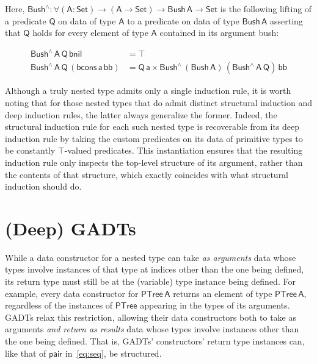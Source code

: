\documentclass[9pt]{entcs}
\begin{document}
\vspace*{-0.05in}

\noindent
Here, $\mathsf{Bush^{\wedge} : \forall (A : Set) \to (A \to Set) \to
  Bush\,A \to Set}$ is the following lifting of a predicate
$\mathsf{Q}$ on data of type $\mathsf{A}$ to a predicate on data of
type $\mathsf{Bush\,A}$ asserting that $\mathsf{Q}$ holds for every
element of type $\mathsf{A}$ contained in its argument bush:

\vspace*{-0.15in}

\begin{align*}
\mathsf{Bush^{\wedge}\,A\,Q\,bnil} &= \mathsf{\top} \\
\mathsf{Bush^{\wedge}\,A\,Q\,(bcons\,a\,bb)} &= \mathsf{Q\,a \times
  Bush^{\wedge}\,(Bush\,A)\,(Bush^{\wedge}\,A\,Q)\,bb}
\end{align*}

\vspace*{-0.05in}

Although a truly nested type admits only a single induction rule, it
is worth noting that for those nested types that do admit distinct
structural induction and deep induction rules, the latter always
generalize the former. Indeed, the structural induction rule for each
such nested type is recoverable from its deep induction rule by taking
the custom predicates on its data of primitive types to be constantly
$\mathsf{\top}$-valued predicates. This instantiation ensures that the
resulting induction rule only inspects the top-level structure of its
argument, rather than the contents of that structure, which exactly
coincides with what structural induction should do.

\section{(Deep) GADTs}\label{sec:GADTs}

While a data constructor for a nested type can take {\em as arguments}
data whose types involve instances of that type at indices other than
the one being defined, its return type must still be at the (variable)
type instance being defined. For example, every data constructor for
$\mathsf{PTree\,A}$ returns an element of type
$\mathsf{PTree\,A}$, regardless of the instances of $\mathsf{PTree}$
appearing in the types of its arguments. GADTs relax this restriction,
allowing their data constructors both to take as arguments \emph{and
  return as results} data whose types involve instances other
than the one being defined. That is, GADTs' constructors' return type
instances can, like that of $\mathsf{pair}$ in~\eqref{eq:seq}, be
structured.
%
\end{document}
